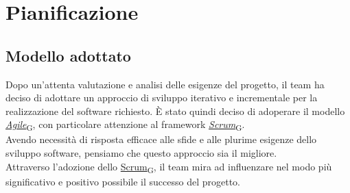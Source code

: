 
\section{Pianificazione}
\subsection{Modello adottato}
Dopo un'attenta valutazione e analisi delle esigenze del progetto, il team ha deciso di adottare un approccio di sviluppo iterativo e incrementale per la realizzazione del software richiesto. È stato quindi deciso di adoperare il modello \href{https://7last.github.io/docs/rtb/documentazione-interna/glossario\#agile}{\textit{Agile}\textsubscript{G}}, con particolare attenzione al framework \href{https://7last.github.io/docs/rtb/documentazione-interna/glossario\#scrum}{\textit{Scrum}\textsubscript{G}}.\\
Avendo necessità di risposta efficace alle sfide e alle plurime esigenze dello sviluppo software, pensiamo che questo approccio sia il migliore.\\
Attraverso l'adozione dello \href{https://7last.github.io/docs/rtb/documentazione-interna/glossario\#scrum}{Scrum\textsubscript{G}}, il team mira ad influenzare nel modo più significativo e positivo possibile il successo del progetto.
